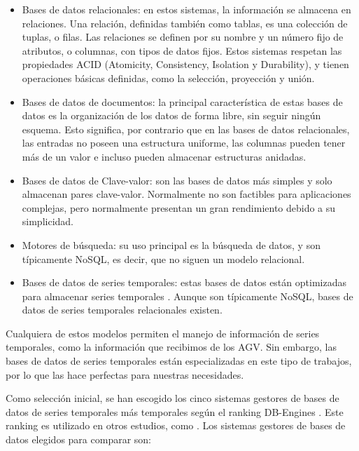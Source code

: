 \begin{itemize}
    \item Bases de datos relacionales: en estos sistemas, la información se almacena en relaciones. Una relación,
        definidas también como tablas, es una colección de tuplas, o filas. Las relaciones se definen por su nombre
        y un número fijo de atributos, o columnas, con tipos de datos fijos. Estos sistemas respetan las propiedades
        ACID (Atomicity, Consistency, Isolation y Durability), y tienen operaciones básicas definidas, como la selección,
        proyección y unión.
    \item Bases de datos de documentos: la principal característica de estas bases de datos es la organización de los datos
        de forma libre, sin seguir ningún esquema. Esto significa, por contrario que en las bases de datos relacionales,
        las entradas no poseen una estructura uniforme, las columnas pueden tener más de un valor e incluso pueden almacenar
        estructuras anidadas.
    \item Bases de datos de Clave-valor: son las bases de datos más simples y solo almacenan pares clave-valor. Normalmente
        no son factibles para aplicaciones complejas, pero normalmente presentan un gran rendimiento debido a su
        simplicidad.
    \item Motores de búsqueda: su uso principal es la búsqueda de datos, y son típicamente NoSQL, es decir, que no siguen
        un modelo relacional.
    \item Bases de datos de series temporales: estas bases de datos están optimizadas para almacenar series temporales \cite{influx:timeseries}.
        Aunque son típicamente NoSQL, bases de datos de series temporales relacionales existen.
\end{itemize}

Cualquiera de estos modelos permiten el manejo de información de series temporales, como la información que recibimos
de los AGV. Sin embargo, las bases de datos de series temporales están especializadas en este tipo de trabajos, por lo que
las hace perfectas para nuestras necesidades.

Como selección inicial, se han escogido los cinco sistemas gestores de bases de datos de series temporales más temporales
según el ranking DB-Engines \cite{dbengines:rankingTSDBMS}. Este ranking es utilizado en otros estudios, como \cite{10.1007/978-3-030-50426-7_28}.
Los sistemas gestores de bases de datos elegidos para comparar son:

